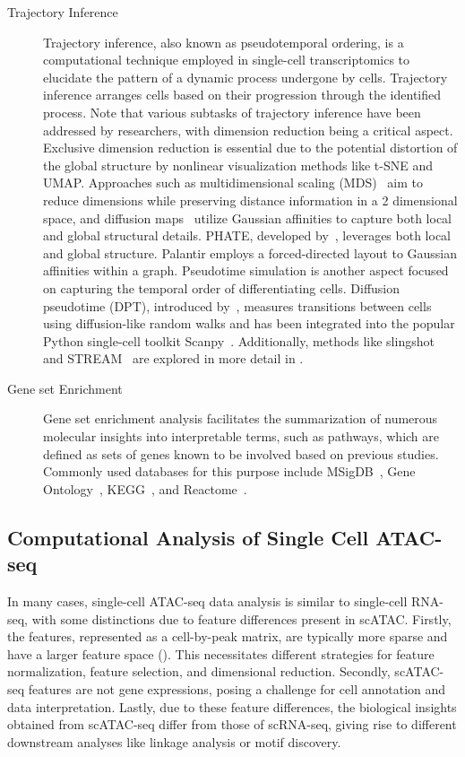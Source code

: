\begin{description}
	\item[Trajectory Inference]
	Trajectory inference, also known as pseudotemporal ordering, is a computational technique employed in single-cell transcriptomics to elucidate the pattern of a dynamic process undergone by cells. Trajectory inference arranges cells based on their progression through the identified process. Note that various subtasks of trajectory inference have been addressed by researchers, with dimension reduction being a critical aspect. Exclusive dimension reduction is essential due to the potential distortion of the global structure by nonlinear visualization methods like t-SNE and UMAP. Approaches such as multidimensional scaling (MDS)~\citep{torgerson1952multidimensional} aim to reduce dimensions while preserving distance information in a 2 dimensional space, and diffusion maps~\citep{coifman2006diffusion} utilize Gaussian affinities to capture both local and global structural details. PHATE, developed by~\cite{moon2017phate}, leverages both local and global structure. Palantir employs a forced-directed layout to Gaussian affinities within a graph. Pseudotime simulation is another aspect focused on capturing the temporal order of differentiating cells. Diffusion pseudotime (DPT), introduced by~\citep{haghverdi2016dpt}, measures transitions between cells using diffusion-like random walks and has been integrated into the popular Python single-cell toolkit Scanpy~\citep{wolf2018scanpy}. Additionally, methods like slingshot~\citep{street2018slingshot} and STREAM~\citep{chen2019stream} are explored in more detail in .

	\item[Gene set Enrichment]
	Gene set enrichment analysis facilitates the summarization of numerous molecular insights into interpretable terms, such as pathways, which are defined as sets of genes known to be involved based on previous studies. Commonly used databases for this purpose include MSigDB~\citep{liberzon2011msigdb}, Gene Ontology~\citep{gene2004go}, KEGG~\citep{kanehisa2007kegg}, and Reactome~\citep{fabregat2018reactome}.
\end{description}

\subsection{Computational Analysis of Single Cell ATAC-seq}
\label{background:sec2:scATAC}
In many cases, single-cell ATAC-seq data analysis is similar to single-cell RNA-seq, with some distinctions due to feature differences present in scATAC. Firstly, the features, represented as a cell-by-peak matrix, are typically more sparse and have a larger feature space (). This necessitates different strategies for feature normalization, feature selection, and dimensional reduction. Secondly, scATAC-seq features are not gene expressions, posing a challenge for cell annotation and data interpretation. Lastly, due to these feature differences, the biological insights obtained from scATAC-seq differ from those of scRNA-seq, giving rise to different downstream analyses like linkage analysis or motif discovery.

